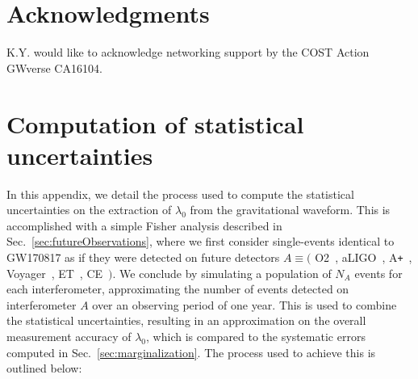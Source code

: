 \documentclass[prd,twocolumn,nofootinbib,superscriptaddress,amsmath,amssymb]{revtex4-1}
\begin{document}
\section*{Acknowledgments}\label{acknowledgments}
K.Y. would like to acknowledge networking support by the COST Action GWverse CA16104.


\appendix

\section{Computation of statistical uncertainties}\label{app:stackingProcedure}

In this appendix, we detail the process used to compute the statistical uncertainties on the extraction of $\lambda_0$ from the gravitational waveform.
This is accomplished with a simple Fisher analysis described in Sec.~\ref{sec:futureObservations}, where we first consider single-events identical to GW170817 as if they were detected on future detectors $A \equiv ($ O2~\cite{aLIGO}, aLIGO~\cite{aLIGO}, A\texttt{+}~\cite{Ap_Voyager_CE}, Voyager~\cite{Ap_Voyager_CE}, ET~\cite{ET}, CE~\cite{Ap_Voyager_CE}$)$.
We conclude by simulating a population of $N_A$ events for each interferometer, approximating the number of events detected on interferometer $A$ over an observing period of one year.
This is used to combine the statistical uncertainties, resulting in an approximation on the overall measurement accuracy of $\lambda_0$, which is compared to the systematic errors computed in Sec.~\ref{sec:marginalization}.
The process used to achieve this is outlined below:
\end{document}
